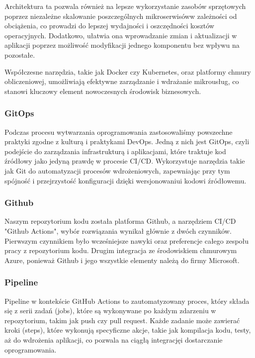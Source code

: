 Architektura ta pozwala również na lepsze wykorzystanie zasobów sprzętowych poprzez niezależne skalowanie poszczególnych mikroserwisów\linebreak w zależności od obciążenia, co prowadzi do lepszej wydajności i oszczędności kosztów operacyjnych. Dodatkowo, ułatwia ona wprowadzanie zmian i aktualizacji w aplikacji poprzez możliwość modyfikacji jednego komponentu bez wpływu na pozostałe.

Współczesne narzędzia, takie jak Docker czy Kubernetes, oraz platformy chmury obliczeniowej, umożliwiają efektywne zarządzanie i wdrażanie mikrousług, co stanowi kluczowy element nowoczesnych środowisk biznesowych.

\subsubsection{GitOps}
Podczas procesu wytwarzania oprogramowania zastosowaliśmy powszechne praktyki zgodne z kulturą i praktykami DevOps. Jedną z nich jest GitOps, czyli podejście do zarządzania infrastrukturą i aplikacjami, które traktuje kod źródłowy jako jedyną prawdę w procesie CI/CD. Wykorzystuje narzędzia takie jak Git do automatyzacji procesów wdrożeniowych, zapewniając przy tym spójność i przejrzystość konfiguracji dzięki wersjonowaniu\linebreak i kodowi źródłowemu.

\subsubsection{Github}
Naszym repozytorium kodu została platforma Github, a narzędziem CI/CD "Github Actions", wybór rozwiązania wynikał głównie z dwóch czynników. Pierwszym czynnikiem było wcześniejsze nawyki oraz preferencje całego zespołu pracy z repozytorium kodu. Drugim integracja ze środowiskiem chmurowym Azure, ponieważ Github i jego wszystkie elementy należą do firmy Microsoft.

\subsubsection{Pipeline}
Pipeline w kontekście GitHub Actions to zautomatyzowany proces, który składa się z serii zadań (jobs), które są wykonywane po każdym zdarzeniu w repozytorium, takim jak push czy pull request. Każde zadanie może zawierać kroki (steps), które wykonują specyficzne akcje, takie jak kompilacja kodu, testy, aż do wdrożenia aplikacji, co pozwala na ciągłą integrację\linebreak i dostarczanie oprogramowania.

